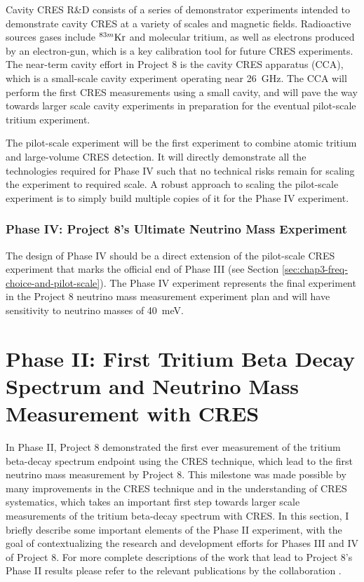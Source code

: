 Cavity CRES R\&D consists of a series of demonstrator experiments intended to demonstrate cavity CRES at a variety of scales and magnetic fields. Radioactive sources gases include $^{83m}\rm{Kr}$ and molecular tritium, as well as electrons produced by an electron-gun, which is a key calibration tool for future CRES experiments. The near-term cavity effort in Project 8 is the cavity CRES apparatus (CCA), which is a small-scale cavity experiment operating near 26~GHz. The CCA will perform the first CRES measurements using a small cavity, and will pave the way towards larger scale cavity experiments in preparation for the eventual pilot-scale tritium experiment. 

The pilot-scale experiment will be the first experiment to combine atomic tritium and large-volume CRES detection. It will directly demonstrate all the technologies required for Phase IV such that no technical risks remain for scaling the experiment to required scale. A robust approach to scaling the pilot-scale experiment is to simply build multiple copies of it for the Phase IV experiment.

\subsubsection*{Phase IV: Project 8's Ultimate Neutrino Mass Experiment}

The design of Phase IV should be a direct extension of the pilot-scale CRES experiment that marks the official end of Phase III (see Section \ref{sec:chap3-freq-choice-and-pilot-scale}). The Phase IV experiment represents the final experiment in the Project 8 neutrino mass measurement experiment plan and will have sensitivity to neutrino masses of 40~meV. 

\section{Phase II: First Tritium Beta Decay Spectrum and Neutrino Mass Measurement with CRES}
\label{sec:chap3-phaseII}

In Phase II, Project 8 demonstrated the first ever measurement of the tritium beta-decay spectrum endpoint using the CRES technique, which lead to the first neutrino mass measurement by Project 8. This milestone was made possible by many improvements in the CRES technique and in the understanding of CRES systematics, which takes an important first step towards larger scale measurements of the tritium beta-decay spectrum with CRES. In this section, I briefly describe some important elements of the Phase II experiment, with the goal of contextualizing the research and development efforts for Phases III and IV of Project 8. For more complete descriptions of the work that lead to Project 8's Phase II results please refer to the relevant publications by the collaboration \cite{p8prc2023,p8prl2023}.

